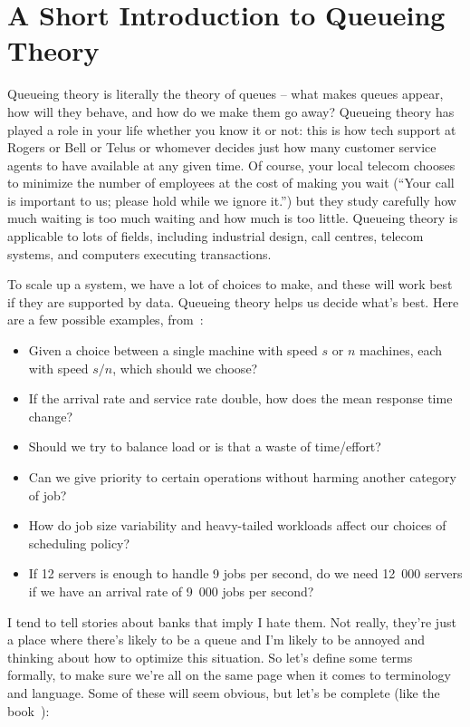 




\section*{A Short Introduction to Queueing Theory}

Queueing theory is literally the theory of queues -- what makes queues appear, how will they behave, and how do we make them go away? Queueing theory has played a role in your life whether you know it or not: this is how tech support at Rogers or Bell or Telus or whomever decides just how many customer service agents to have available at any given time. Of course, your local telecom chooses to minimize the number of employees at the cost of making you wait (``Your call is important to us; please hold while we ignore it.'') but they study carefully how much waiting is too much waiting and how much is too little. Queueing theory is applicable to lots of fields, including industrial design, call centres, telecom systems, and computers executing transactions. 

To scale up a system, we have a lot of choices to make, and these will work best if they are supported by data. Queueing theory helps us decide what's best. Here are a few possible examples, from~\cite{pmd}:

\begin{itemize}
 \item Given a choice between a single machine with speed $s$ or $n$ machines, each with speed $s/n$, which should we choose?
 \item If the arrival rate and service rate double, how does the mean response time change?
 \item Should we try to balance load or is that a waste of time/effort?
 \item Can we give priority to certain operations without harming another category of job?
 \item How do job size variability and heavy-tailed workloads affect our choices of scheduling policy?
 \item If 12 servers is enough to handle 9 jobs per second, do we need 12~000 servers if we have an arrival rate of 9~000 jobs per second?
\end{itemize}

I tend to tell stories about banks that imply I hate them. Not really, they're just a place where there's likely to be a queue and I'm likely to be annoyed and thinking about how to optimize this situation. So let's define some terms formally, to make sure we're all on the same page when it comes to terminology and language. Some of these will seem obvious, but let's be complete (like the book~\cite{swps}):

